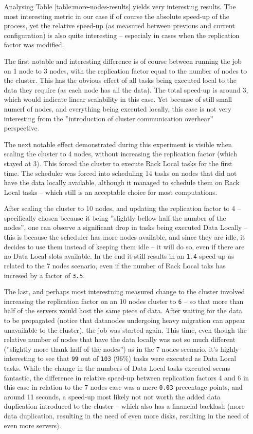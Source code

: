 Analysing Table \ref{table:more-nodes-results} yields very interesting results. The most interesting metric in our case if of course the absolute speed-up of the process, yet the relative speed-up (as measured between previous and current configuration) is also quite interesting -- especialy in cases when the replication factor was modified.

The first notable and interesting difference is of course between running the job on 1 node to 3 nodes, with the replication factor equal to the number of nodes to the cluster. This has the obvious effect of all tasks being executed local to the data they require (as each node has all the data). The total speed-up is around 3, which would indicate linear scalability in this case. Yet becuase of still small numerf of nodes, and everything being executed locally, this case is not very interesting from the ''introduction of cluster communication overhear'' perspective.

The next notable effect demonstrated during this experiment is visible when scaling the cluster to 4 nodes, without increasing the replication factor (which stayed at 3). This forced the cluster to execute Rack Local tasks for the first time. The scheduler was forced into scheduling 14 tasks on nodes that did not have the data locally available, although it managed to schedule them on Rack Local tasks -- which still is an acceptable choice for most computations.

After scaling the cluster to 10 nodes, and updating the replication factor to 4 -- specifically chosen because it being ''slightly bellow half the number of the nodes'', one can observe a significant drop in tasks being executed Data Locally -- this is because the scheduler has more nodes available, and since they are idle, it decides to use them instead of keeping them idle -- it will do so, even if there are no Data Local slots available. In the end it still results in an \verb|1.4| speed-up as related to the 7 nodes scenario, even if the number of Rack Local taks has incresed by a factor of \verb|3.5|.

The last, and perhaps most interestning measured change to the cluster involved increasing the replication factor on an 10 nodes cluster to \verb|6| -- so that more than half of the servers would host the same piece of data. After waiting for the data to be propagated (notice that datanodes undergoing heavy migration can appear unavailable to the cluster), the job was started again. This time, even though the relative number of nodes that have the data locally was not so much different (''slightly more thank half of the nodes'') as in the 7 nodes scenario, it's highly interesting to see that \verb|99| out of \verb|103| (96\%) tasks were executed as Data Local tasks. While the change in the numbers of Data Local tasks executed seems fantastic, the difference in relative speed-up between replication factors 4 and 6 in this case in relation to the 7 nodes case was a mere \verb|0.03| precentage points, and around 11 seconds, a speed-up most likely not not worth the added data duplication introduced to the cluster -- which also has a financial backlash (more data duplication, resulting in the need of even more disks, resulting in the need of even more servers).

